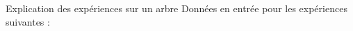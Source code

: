 \begin{frame}{Explication des expériences sur un arbre}
Données en \alert{entrée} pour les expériences suivantes :
\begin{figure}\centering
\end{figure}
\end{frame}

